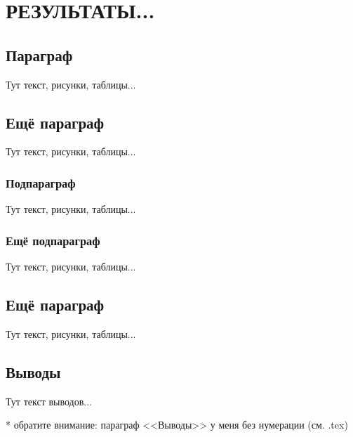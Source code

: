 \chapter{РЕЗУЛЬТАТЫ...} \label{chapter2}


\section{Параграф}

Тут текст, рисунки, таблицы...

\section{Ещё параграф}

Тут текст, рисунки, таблицы...

\subsection{Подпараграф}

Тут текст, рисунки, таблицы...



\subsection{Ещё подпараграф}

Тут текст, рисунки, таблицы...


\section{Ещё параграф}

Тут текст, рисунки, таблицы...


\section*{Выводы}


Тут текст выводов...

* обратите внимание: параграф <<Выводы>> у меня без нумерации (см. .tex)


